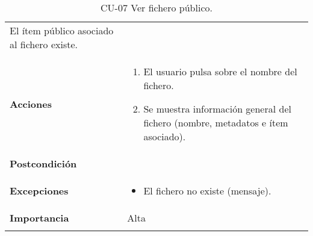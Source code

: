 \begin{longtable}[]{@{}ll@{}}
\begin{minipage}[t]{0.71\columnwidth}
El ítem público asociado al fichero existe.\strut
\end{minipage}\tabularnewline
\begin{minipage}[t]{0.23\columnwidth}\raggedright
\textbf{Acciones}\strut
\end{minipage} & \begin{minipage}[t]{0.71\columnwidth}\raggedright
\begin{enumerate}
\def\labelenumi{\arabic{enumi}.}
\tightlist
\item
  El usuario pulsa sobre el nombre del fichero.
\item
  Se muestra información general del fichero (nombre, metadatos e ítem
  asociado).
\end{enumerate}\strut
\end{minipage}\tabularnewline
\begin{minipage}[t]{0.23\columnwidth}\raggedright
\textbf{Postcondición}\strut
\end{minipage} & \begin{minipage}[t]{0.71\columnwidth}\raggedright
\strut
\end{minipage}\tabularnewline
\begin{minipage}[t]{0.23\columnwidth}\raggedright
\textbf{Excepciones}\strut
\end{minipage} & \begin{minipage}[t]{0.71\columnwidth}\raggedright
\begin{itemize}
\tightlist
\item
  El fichero no existe (mensaje).
\end{itemize}\strut
\end{minipage}\tabularnewline
\begin{minipage}[t]{0.23\columnwidth}\raggedright
\textbf{Importancia}\strut
\end{minipage} & \begin{minipage}[t]{0.71\columnwidth}\raggedright
Alta\strut
\end{minipage}\tabularnewline
\bottomrule
\caption{CU-07 Ver fichero público.}
\end{longtable}

